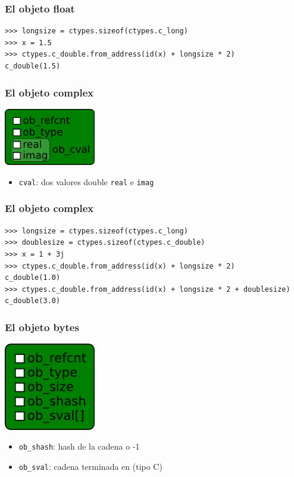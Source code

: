 \documentclass[10pt]{beamer}
\begin{document}
  \begin{frame}[containsverbatim]
    \frametitle{El objeto float}
    \begin{verbatim}
>>> longsize = ctypes.sizeof(ctypes.c_long)
>>> x = 1.5
>>> ctypes.c_double.from_address(id(x) + longsize * 2)
c_double(1.5)
    \end{verbatim}
  \end{frame}

  \begin{frame}[containsverbatim]
    \frametitle{El objeto complex}
    \begin{center}\includegraphics[width=4cm]{img/Complex.png}\end{center}
    \begin{itemize}
      \item \verb+cval+: dos valores double \verb+real+ e \verb+imag+
    \end{itemize}
  \end{frame}

  \begin{frame}[containsverbatim]
    \frametitle{El objeto complex}
    \begin{verbatim}
>>> longsize = ctypes.sizeof(ctypes.c_long)
>>> doublesize = ctypes.sizeof(ctypes.c_double)
>>> x = 1 + 3j
>>> ctypes.c_double.from_address(id(x) + longsize * 2)
c_double(1.0)
>>> ctypes.c_double.from_address(id(x) + longsize * 2 + doublesize)
c_double(3.0)
    \end{verbatim}
  \end{frame}

  \begin{frame}[containsverbatim]
    \frametitle{El objeto bytes}
    \begin{center}\includegraphics[width=4cm]{img/Bytes.png}\end{center}
    \begin{itemize}
      \item \verb+ob_shash+: hash de la cadena o -1
      \item \verb+ob_sval+: cadena terminada en \0 (tipo C)
    \end{itemize}
  \end{frame}
\end{document}
